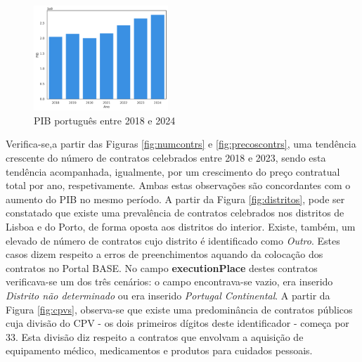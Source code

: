 \begin{figure}
	\centering
	\includegraphics[width=0.45\textwidth]{imagens/pib.png}
	\caption{PIB português entre 2018 e 2024}
\end{figure}


Verifica-se,a partir das Figuras \ref{fig:numcontrs} e \ref{fig:precoscontrs}, uma tendência crescente do número de contratos celebrados entre 2018 e 2023, sendo esta tendência acompanhada, igualmente, por um crescimento do preço contratual total por ano, respetivamente. Ambas estas observações são concordantes com o aumento do PIB no mesmo período. 
A partir da Figura \ref{fig:distritos}, pode ser constatado que existe uma prevalência de contratos celebrados nos distritos de Lisboa e do Porto, de forma oposta aos distritos do interior. Existe, também, um elevado de número de contratos cujo distrito é identificado como \textit{Outro}. Estes casos dizem respeito a erros de preenchimentos aquando da colocação dos contratos no Portal BASE. No campo \textbf{executionPlace} destes contratos verificava-se um dos três cenários: o campo encontrava-se vazio, era inserido \textit{Distrito não determinado} ou era inserido \textit{Portugal Continental}. 
A partir da Figura \ref{fig:cpvs}, observa-se que existe uma predominância de contratos públicos cuja divisão do CPV - os dois primeiros dígitos deste identificador - começa por 33. Esta divisão diz respeito a contratos que envolvam a aquisição de equipamento médico, medicamentos e produtos para cuidados pessoais. 



\begin{table}[H]
	\centering
	\renewcommand{\arraystretch}{1.35}
	\setlength{\tabcolsep}{20pt}
	\caption{Descrição das principais divisões de CPV}
	\label{tab:maincpvs}
\end{table}


